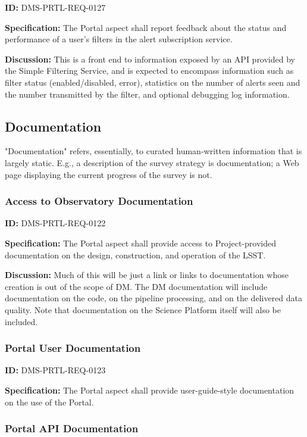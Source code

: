 \documentclass[SE,toc]{lsstdoc}
\begin{document}
\label{DMS-PRTL-REQ-0127}
\textbf{ID:} DMS-PRTL-REQ-0127

\textbf{Specification:}
The Portal aspect shall report feedback about the status and performance of a user's filters in the alert subscription service.

\textbf{Discussion:}
This is a front end to information exposed by an API provided by the Simple Filtering Service, and is expected to encompass information such as filter status (enabled/disabled, error), statistics on the number of alerts seen and the number transmitted by the filter, and optional debugging log information.

\subsection{Documentation}

"Documentation" refers, essentially, to curated human-written information that is largely static.  E.g., a description of the survey strategy is documentation; a Web page displaying the current progress of the survey is not.

\subsubsection{Access to Observatory Documentation}

\label{DMS-PRTL-REQ-0122}
\textbf{ID:} DMS-PRTL-REQ-0122

\textbf{Specification:}
The Portal aspect shall provide access to Project-provided documentation on the design, construction, and operation of the LSST.

\textbf{Discussion:}
Much of this will be just a link or links to documentation whose creation is out of the scope of DM.  The DM documentation will include documentation on the code, on the pipeline processing, and on the delivered data quality.  Note that documentation on the Science Platform itself will also be included.

\subsubsection{Portal User Documentation}

\label{DMS-PRTL-REQ-0123}
\textbf{ID:} DMS-PRTL-REQ-0123

\textbf{Specification:}
The Portal aspect shall provide user-guide-style documentation on the use of the Portal.

\subsubsection{Portal API Documentation}
\end{document}
